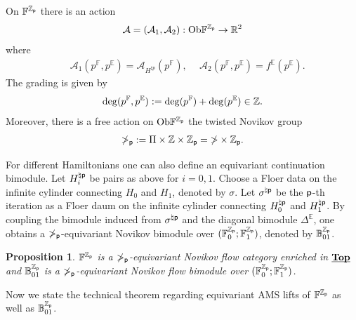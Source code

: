 \documentclass[reqno, 10pt]{amsart}
\numberwithin{equation}{section}
\numberwithin{equation}{section}
\newtheorem{prop}[thm]{Proposition}
\theoremstyle{definition}
\theoremstyle{remark}
\newcommand{\beqn}{\begin{equation*}}
\newcommand{\eeqn}{\end{equation*}}
\newcommand{\mb}{\mathbb}
\newcommand{\mc}{\mathcal}
\newcommand{\p}{{\sf p}}
\newcommand{\zp}{{{\mb Z}_{\sf p}}}
\newcommand{\ep}{{{\mathbb E}}}
\newcommand{\uds}[1]{\underline{\smash{#1}}}
\begin{document}
On ${\mb F}^\zp$ there is an action
\beqn
{\mc A} = ({\mc A}_1, {\mc A}_2): {\rm Ob}{\mb F}^\zp \to {\mb R}^2
\eeqn
where
\begin{align*}
&\ {\mc A}_1(p^{\mb F}, p^\ep) = {\mc A}_{H^{\natural p}}(p^{\mb F}),\ &\ {\mc A}_2(p^{\mb F}, p^\ep) = f^\ep( p^\ep).
\end{align*}
The grading is given by 
\beqn
{\rm deg} (p^{\mb F}, p^\ep):= {\rm deg}(p^{\mb F}) + {\rm deg}(p^\ep)\in {\mb Z}.
\eeqn
Moreover, there is a free action on ${\rm Ob} {\mb F}^\zp$ the twisted Novikov group
\beqn
{\mb\Pi}_\p:= \Pi \times {\mb Z} \times \zp = {\mb \Pi} \times {\mb Z}_\p.
\eeqn
 

For different Hamiltonians one can also define an equivariant continuation bimodule. Let $H_i^{\natural \p}$ be pairs as above for $i = 0, 1$. Choose a Floer data on the infinite cylinder connecting $H_0$ and $H_1$, denoted by $\sigma$. Let $\sigma^{\natural \p}$ be the $\p$-th iteration as a Floer daum on the infinite cylinder connecting $H_0^{\natural \p}$ and $H_1^{\natural \p}$. By coupling the bimodule induced from $\sigma^{\natural \p}$ and the diagonal bimodule ${\mb \Delta}^{\ep}$, one obtains a $\mb\Pi_\p$-equivariant  Novikov bimodule over $({\mb F}_0^{\zp}; {\mb F}_1^{\zp})$, denoted by ${\mb B}^{\zp}_{01}$. 

\begin{prop}
$\mb{F}^\zp$ is a $\mb\Pi_\p$-equivariant Novikov flow category enriched in $\uds{\bf Top}$ and $\mb{B}_{01}^\zp$ is a $\mb\Pi_\p$-equivariant Novikov flow bimodule over $(\mb{F}_0^\zp; \mb{F}_1^\zp)$.
\end{prop}

Now we state the technical theorem regarding equivariant AMS lifts of ${\mb F}^\zp$ as well as $\mb{B}_{01}^{\zp}$.
\end{document}

